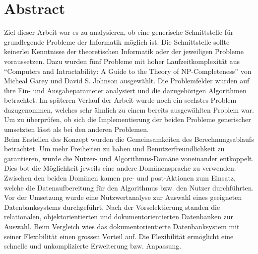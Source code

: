 %
%

\thispagestyle{empty}


\newpage
\thispagestyle{empty}
\chapter*{Abstract}\label{abstract}
Ziel dieser Arbeit war es zu analysieren, ob eine generische Schnittstelle für grundlegende Probleme der Informatik möglich ist. Die Schnittstelle sollte keinerlei Kenntnisse 
der theoretischen Informatik oder der jeweiligen Probleme voraussetzen. Dazu wurden fünf Probleme mit hoher Laufzeitkomplexität aus "`Computers and Intractability: A Guide to the Theory of 
NP-Completeness"' von Micheal Garey und David S. Johnson ausgewählt. Die Problemfelder wurden auf ihre Ein- und Ausgabeparameter analysiert und die dazugehörigen 
Algorithmen betrachtet. Im späteren Verlauf der Arbeit wurde noch ein sechstes Problem dazugenommen, welches sehr ähnlich zu einem bereits ausgewählten Problem war. Um zu überprüfen, ob 
sich die Implementierung der beiden Probleme generischer umsetzten lässt als bei den anderen Problemen.\\

Beim Erstellen des Konzept wurden die Gemeinsamkeiten des Berechnungsablaufs betrachtet. Um mehr Freiheiten zu haben und Benutzerfreundlichkeit zu garantieren, wurde die Nutzer- und 
Algorithmus-Domäne voneinander entkoppelt. Dies bot die Möglichkeit jeweils eine andere Domänensprache zu verwenden. Zwischen den beiden Domänen kamen pre- und post-Aktionen zum Einsatz, 
welche die Datenaufbereitung für den Algorithmus bzw. den Nutzer durchführten.\\

Vor der Umsetzung wurde eine Nutzwertanalyse zur Auswahl eines geeigneten Datenbanksystems durchgeführt. Nach der Vorselektierung standen die relationalen, objektorientierten und 
dokumentorientierten Datenbanken zur Auswahl. Beim Vergleich wies das dokumentorientierte Datenbanksystem mit seiner Flexibilität einen grossen Vorteil auf. Die Flexibilität ermöglicht eine 
schnelle und unkomplizierte Erweiterung bzw. Anpassung.\\

